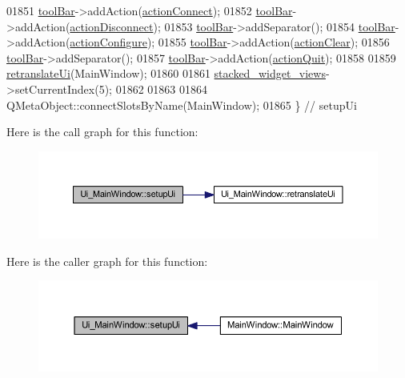 \begin{DoxyCode}
01851         \hyperlink{a00080_ab84dc49349f514d7b7d3fe8e78de069b}{toolBar}->addAction(\hyperlink{a00080_aa0785566311fc48271690fb68b1d4c5f}{actionConnect});
01852         \hyperlink{a00080_ab84dc49349f514d7b7d3fe8e78de069b}{toolBar}->addAction(\hyperlink{a00080_a8a16b3aef75b279eaaa887152d2f746b}{actionDisconnect});
01853         \hyperlink{a00080_ab84dc49349f514d7b7d3fe8e78de069b}{toolBar}->addSeparator();
01854         \hyperlink{a00080_ab84dc49349f514d7b7d3fe8e78de069b}{toolBar}->addAction(\hyperlink{a00080_a3860abde3cfd3f6170e28fddde73f11e}{actionConfigure});
01855         \hyperlink{a00080_ab84dc49349f514d7b7d3fe8e78de069b}{toolBar}->addAction(\hyperlink{a00080_ac8539dcd87955047877cb256aff60453}{actionClear});
01856         \hyperlink{a00080_ab84dc49349f514d7b7d3fe8e78de069b}{toolBar}->addSeparator();
01857         \hyperlink{a00080_ab84dc49349f514d7b7d3fe8e78de069b}{toolBar}->addAction(\hyperlink{a00080_a188c243f36a2dbc10e4e2a0ad94273b1}{actionQuit});
01858 
01859         \hyperlink{a00080_a097dd160c3534a204904cb374412c618}{retranslateUi}(MainWindow);
01860 
01861         \hyperlink{a00080_a59e39bd3d716004e840a5be5dda18b96}{stacked\_widget\_views}->setCurrentIndex(5);
01862 
01863 
01864         QMetaObject::connectSlotsByName(MainWindow);
01865     \} \textcolor{comment}{// setupUi}
\end{DoxyCode}


Here is the call graph for this function\+:
\nopagebreak
\begin{figure}[H]
\begin{center}
\leavevmode
\includegraphics[width=350pt]{da/dec/a00080_acf4a0872c4c77d8f43a2ec66ed849b58_cgraph}
\end{center}
\end{figure}




Here is the caller graph for this function\+:
\nopagebreak
\begin{figure}[H]
\begin{center}
\leavevmode
\includegraphics[width=350pt]{da/dec/a00080_acf4a0872c4c77d8f43a2ec66ed849b58_icgraph}
\end{center}
\end{figure}




